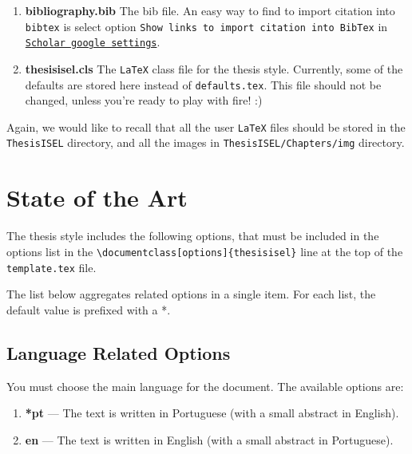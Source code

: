\begin{enumerate}
\begin{enumerate}
		\item \textbf{bibliography.bib} The bib file. An easy way to find to import citation into \texttt{bibtex} is select option \texttt{Show links to import citation into
Bib\-Tex} in \href{http://scholar.google.pt/scholar_settings?hl=en&as_sdt=0,5}{\texttt{Scholar google settings}}.
		\item \textbf{thesisisel.cls} The  \texttt{LaTeX} class file for the thesis{} style. Currently, some of the defaults are stored here instead of \verb!defaults.tex!. This file should not be changed, unless you're ready to play with fire! :)
	\end{enumerate}
\end{enumerate}

Again, we would like to recall that all the user \texttt{LaTeX} files should be stored in the \verb!ThesisISEL! directory, and all the images in \verb!ThesisISEL/Chapters/img! directory.

\section{State of the Art} %
\label{sec:state_of_the_art}

The thesis{} style includes the following options, that must be included in the options list in the \verb!\documentclass[options]{thesisisel}! line at the top of the \texttt{template.tex} file.

The list below aggregates related options in a single item. For each list, the default value is prefixed with a *.

\subsection{Language Related Options} %
\label{sub:language_related_options}

You must choose the main language for the document. The available options are:

\begin{enumerate}
	\item \textbf{*pt} --- The text is written in Portuguese (with a small abstract in English).
	\item \textbf{en} --- The text is written in English (with a small abstract in Portuguese).
\end{enumerate}

